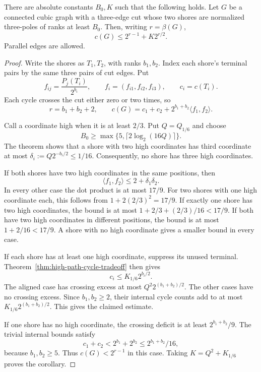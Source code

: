 \begin{corollary}
\label{cor:large-three-cut-half-exponent}
There are absolute constants $B_0,K$ such that the following holds.
Let $G$ be a connected cubic graph with a three-edge cut whose two shores are normalized three-poles of ranks at least $B_0$.
Then, writing $r=\beta(G)$,
\[
 c(G)\le2^{r-1}+K2^{r/2}.
\]
Parallel edges are allowed.
\end{corollary}

\begin{proof}
Write the shores as $T_1,T_2$, with ranks $b_1,b_2$.
Index each shore's terminal pairs by the same three pairs of cut edges.
Put
\[
 f_{ij}=\frac{P_j(T_i)}{2^{b_i}},\qquad
 f_i=(f_{i1},f_{i2},f_{i3}),\qquad c_i=c(T_i).
\]
Each cycle crosses the cut either zero or two times, so
\[
 r=b_1+b_2+2,\qquad
 c(G)=c_1+c_2+2^{b_1+b_2}\langle f_1,f_2\rangle.
\]

Call a coordinate high when it is at least $2/3$.
Put $Q=Q_{1/6}$ and choose
\[
 B_0\ge\max\{5,\lceil2\log_2(16Q)\rceil\}.
\]
The theorem shows that a shore with two high coordinates has third coordinate at most
$\delta_i:=Q2^{-b_i/2}\le1/16$.
Consequently, no shore has three high coordinates.

If both shores have two high coordinates in the same positions, then
\[
 \langle f_1,f_2\rangle\le2+\delta_1\delta_2.
\]
In every other case the dot product is at most $17/9$.
For two shores with one high coordinate each, this follows from $1+2(2/3)^2=17/9$.
If exactly one shore has two high coordinates, the bound is at most $1+2/3+(2/3)/16<17/9$.
If both have two high coordinates in different positions, the bound is at most $1+2/16<17/9$.
A shore with no high coordinate gives a smaller bound in every case.

If each shore has at least one high coordinate, suppress its unused terminal.
Theorem~\ref{thm:high-path-cycle-tradeoff} then gives
\[
 c_i\le K_{1/6}2^{b_i/2}.
\]
The aligned case has crossing excess at most $Q^2 2^{(b_1+b_2)/2}$.
The other cases have no crossing excess.
Since $b_1,b_2\ge2$, their internal cycle counts add to at most
$K_{1/6}2^{(b_1+b_2)/2}$.
This gives the claimed estimate.

If one shore has no high coordinate, the crossing deficit is at least
$2^{b_1+b_2}/9$.
The trivial internal bounds satisfy
\[
 c_1+c_2<2^{b_1}+2^{b_2}
 \le2^{b_1+b_2}/16,
\]
because $b_1,b_2\ge5$.
Thus $c(G)<2^{r-1}$ in this case.
Taking $K=Q^2+K_{1/6}$ proves the corollary.
\end{proof}

